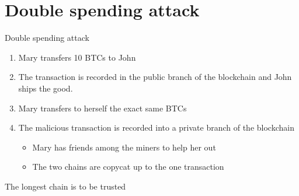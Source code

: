 \documentclass{beamer}
\begin{document}
\section{Double spending attack}
\begin{frame}{Double spending attack}
\scriptsize
\begin{enumerate}
\item Mary transfers 10 BTCs to John
\item The transaction is recorded in the public branch of the blockchain and John ships the good.
\item Mary transfers to herself the exact same BTCs
\item The malicious transaction is recorded into a private branch of the blockchain
\begin{itemize}
  \scriptsize
\item Mary has friends among the miners to help her out
\item The two chains are copycat up to the one transaction
\end{itemize}
\end{enumerate}
\begin{tcolorbox}[enhanced,drop shadow, title=Fact (Bitcoin has only one rule)]
The longest chain is to be trusted
\end{tcolorbox}
\end{frame}
\end{document}
